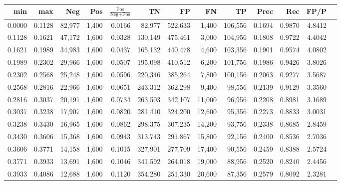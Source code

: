 \begin{tabular}{rrrrrrrrrrrrr}
\toprule
   min &    max &    Neg &   Pos & $\frac{\text{Pos}}{\text{Neg}+\text{Pos}}$ &      TN &      FP &      FN &      TP &   Prec &    Rec &   FP/P \\
\midrule
0.0000 & 0.1128 & 82,977 & 1,400 &                                     0.0166 &  82,977 & 522,633 &   1,400 & 106,556 & 0.1694 & 0.9870 & 4.8412 \\
0.1128 & 0.1621 & 47,172 & 1,600 &                                     0.0328 & 130,149 & 475,461 &   3,000 & 104,956 & 0.1808 & 0.9722 & 4.4042 \\
0.1621 & 0.1989 & 34,983 & 1,600 &                                     0.0437 & 165,132 & 440,478 &   4,600 & 103,356 & 0.1901 & 0.9574 & 4.0802 \\
0.1989 & 0.2302 & 29,966 & 1,600 &                                     0.0507 & 195,098 & 410,512 &   6,200 & 101,756 & 0.1986 & 0.9426 & 3.8026 \\
0.2302 & 0.2568 & 25,248 & 1,600 &                                     0.0596 & 220,346 & 385,264 &   7,800 & 100,156 & 0.2063 & 0.9277 & 3.5687 \\
0.2568 & 0.2816 & 22,966 & 1,600 &                                     0.0651 & 243,312 & 362,298 &   9,400 &  98,556 & 0.2139 & 0.9129 & 3.3560 \\
0.2816 & 0.3037 & 20,191 & 1,600 &                                     0.0734 & 263,503 & 342,107 &  11,000 &  96,956 & 0.2208 & 0.8981 & 3.1689 \\
0.3037 & 0.3238 & 17,907 & 1,600 &                                     0.0820 & 281,410 & 324,200 &  12,600 &  95,356 & 0.2273 & 0.8833 & 3.0031 \\
0.3238 & 0.3430 & 16,965 & 1,600 &                                     0.0862 & 298,375 & 307,235 &  14,200 &  93,756 & 0.2338 & 0.8685 & 2.8459 \\
0.3430 & 0.3606 & 15,368 & 1,600 &                                     0.0943 & 313,743 & 291,867 &  15,800 &  92,156 & 0.2400 & 0.8536 & 2.7036 \\
0.3606 & 0.3771 & 14,158 & 1,600 &                                     0.1015 & 327,901 & 277,709 &  17,400 &  90,556 & 0.2459 & 0.8388 & 2.5724 \\
0.3771 & 0.3933 & 13,691 & 1,600 &                                     0.1046 & 341,592 & 264,018 &  19,000 &  88,956 & 0.2520 & 0.8240 & 2.4456 \\
0.3933 & 0.4086 & 12,688 & 1,600 &                                     0.1120 & 354,280 & 251,330 &  20,600 &  87,356 & 0.2579 & 0.8092 & 2.3281 \\

\end{tabular}
